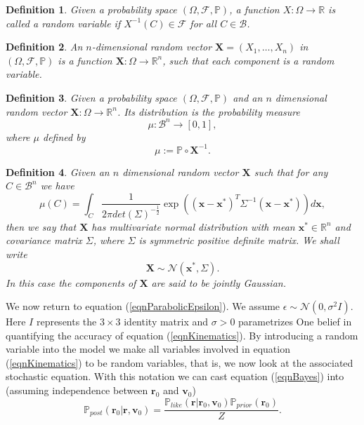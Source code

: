 \documentclass[12pt]{book}
\newtheorem{definition}{Definition}
\newcommand{\post}{\mathbb{P}_{post}}
\newcommand{\like}{\mathbb{P}_{like}}
\newcommand{\prior}{\mathbb{P}_{prior}}
\newcommand{\p}{\mathbb{P}}
\begin{document}
\begin{definition}\label{dfnrandonvariables}
Given a probability space $(\Omega,\mathscr{F},\p)$, a function $X:\Omega\rightarrow\mathbb{R}$ is called 
a random variable
if $X^{-1}(C)\in\mathscr{F}$ for all $C\in\mathcal{B}$.
\end{definition}

\begin{definition}
 An $n$-dimensional random vector $\textbf{X}=(X_{1},\ldots,X_{n})$ in $(\Omega,\mathscr{F},\p)$ 
is a function $\textbf{X}:\Omega\rightarrow\mathbb{R}^{n}$, such that each component is a random variable. 
\end{definition}

\begin{definition}
Given a probability space $(\Omega,\mathscr{F},\p)$ and an $n$ dimensional  random vector 
$\mathbf{X}:\Omega\rightarrow\mathbb{R}^{n}$.
Its distribution  is the probability measure
\begin{equation*}
\mu:\mathcal{B}^{n}\rightarrow [0,1],
\end{equation*}
where  $\mu$ defined by 
\begin{equation*}
\mu:=\p\circ \textbf{X}^{-1}.
\end{equation*}
\end{definition}
\begin{definition}
Given an $n$ dimensional random vector $\mathbf{X}$ such that for any 
$C\in\mathcal{B}^{n}$ we have
\begin{equation}\label{eqnmultivariateGaussianDefinition}
\mu(C)=\int_{C}
\frac{1}{2\pi det(\Sigma)^{-\frac{1}{2}}}\exp((\textbf{x}-\textbf{x}^{*})^{T}\Sigma^{-1}
(\textbf{x}-\textbf{x}^{*}))d\textbf{x},
\end{equation}
then we say
that $\textbf{X}$ has multivariate normal distribution with mean $\textbf{x}^{*}\in\mathbb{R}^{n}$
and covariance matrix $\Sigma$, where $\Sigma$ is symmetric positive definite matrix. We shall write
\begin{equation}\label{eqnMultivariate}
\textbf{X}\sim \mathcal{N}(\textbf{x}^{*},\Sigma).
\end{equation}
In this case the components of $\textbf{X}$ are said to be \textit{jointly Gaussian}.
\end{definition}

We now return to equation (\ref{eqnParabolicEpsilon}). We assume $\epsilon\sim\mathcal{N}(0,\sigma^{2}I)$.
Here $I$
represents the $3\times 3$ identity matrix and $\sigma>0$ parametrizes One belief in quantifying the 
accuracy  
of equation (\ref{eqnKinematics}).  By introducing a random variable into the model
we make all variables involved  in equation (\ref{eqnKinematics})
to be  random variables, that is, we now look at the  associated stochastic equation. With this notation
we can cast equation (\ref{eqnBayes}) into  (assuming independence between $\textbf{r}_{0}$ and $\textbf{v}_{0}$)
\begin{equation}\label{eqnpostrock}
\post(\textbf{r}_{0}|\textbf{r},\textbf{v}_{0})=\frac{\like(\textbf{r}|\textbf{r}_{0},\textbf{v}_{0})
\prior(\textbf{r}_{0})}{Z}.
\end{equation}
\end{document}
